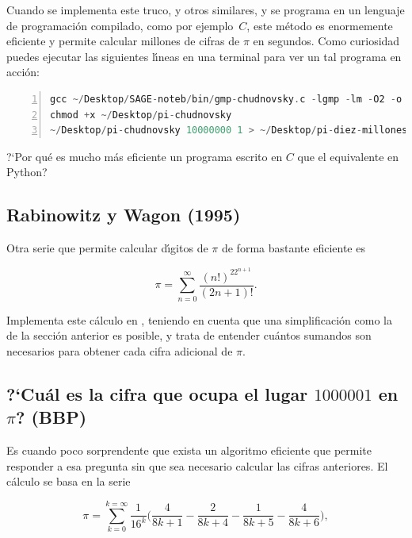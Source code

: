 Cuando se implementa  este truco, y otros similares,  y se programa en un lenguaje de
programaci\'on compilado, como por ejemplo~$C$, 
este m\'etodo es enormemente eficiente y permite calcular millones de cifras de
$\pi$ en segundos. Como curiosidad puedes
ejecutar las siguientes l\'{\i}neas en una terminal para ver un tal programa en
acci\'on:
\begin{lstlisting}[basicstyle=\color{black},language={C},backgroundcolor=\color{
LightYellow},numbers=left,linewidth=.99\textwidth]
gcc ~/Desktop/SAGE-noteb/bin/gmp-chudnovsky.c -lgmp -lm -O2 -o  ~/Desktop/pi-chudnovsky 
chmod +x ~/Desktop/pi-chudnovsky
~/Desktop/pi-chudnovsky 10000000 1 > ~/Desktop/pi-diez-millones.txt
\end{lstlisting}



?`Por qu\'e es mucho m\'as eficiente un programa escrito en $C$ que el
equivalente en Python?



\subsection{Rabinowitz y  Wagon (1995)}


Otra serie que permite calcular d\'{\i}gitos de $\pi$ de forma bastante
eficiente es  


\[\pi=\sum_{n=0}^{\infty}\frac{(n!)^22^{n+1}}{(2n+1)!}.\]

\begin{ejer}

Implementa este c\'alculo en {\sage} , teniendo en cuenta que una
simplificaci\'on 
como la de la secci\'on anterior es posible, y trata de entender cu\'antos
sumandos son necesarios para obtener cada cifra adicional de $\pi$.
\end{ejer}




\subsection{?`Cu\'al es la cifra que ocupa el lugar $1000001$ en $\pi$? (BBP)}

Es cuando poco sorprendente que exista un algoritmo eficiente que permite 
responder
a esa pregunta sin que sea necesario calcular las cifras anteriores. El
c\'alculo se basa en la serie 

\begin{equation}\label{picifras}
\pi=\sum_{k=0}^{k=\infty}\frac{1}{16^k}\Big(\frac{4}{8k+1}-\frac{2}{8k+4}-\frac{
1}
{8k+5}-\frac{4}{8k+6}\Big),
\end{equation}

